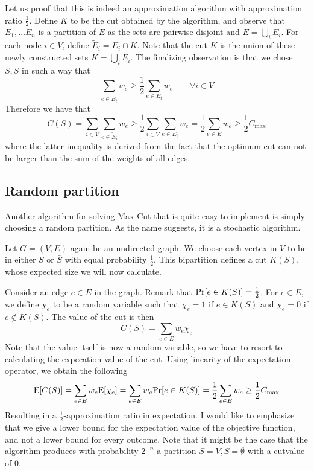 Let us proof that this is indeed an approximation algorithm with approximation ratio $\frac{1}{2}$. Define $K$ to be the cut obtained by the algorithm, and observe that $E_1, \dots E_n$ is a partition of $E$ as the sets are pairwise disjoint and $E = \bigcup_i E_i$. For each node $i \in V$, define $\tilde{E}_i = E_i \cap K$. Note that the cut $K$ is the union of these newly constructed sets $K = \bigcup_i \tilde{E}_i$. The finalizing observation is that we chose $S,\bar{S}$ in such a way that 
\begin{equation}
\sum_{e\in \tilde{E}_i}w_e \geq \frac{1}{2}\sum_{e \in E_i}w_e \qquad \forall i \in V
\end{equation}
Therefore we have that 
\begin{equation}
	C(S) = \sum_{i\in V} \sum_{e \in \tilde{E}_i} w_e \geq \frac{1}{2}\sum_{i\in V} \sum_{e \in E_i} w_e = \frac{1}{2}\sum_{e\in E} w_e \geq \frac{1}{2}C_{\max}
\end{equation}
where the latter inequality is derived from the fact that the optimum cut can not be larger than the sum of the weights of all edges.

\subsection{Random partition}
\label{sec:random-partition}
Another algorithm for solving Max-Cut that is quite easy to implement is simply choosing a random partition. As the name suggests, it is a stochastic algorithm. 

Let $G = (V,E)$ again be an undirected graph. We choose each vertex in $V$ to be in either $S$ or $\bar{S}$ with equal probability $\frac{1}{2}$. This bipartition defines a cut $K(S)$, whose expected size we will now calculate. 

Consider an edge $e \in E$ in the graph. Remark that $\text{Pr}[e \in K(S)] = \frac{1}{2}$. For $e \in E$, we define $\chi_e$ to be a random variable such that $\chi_e = 1$ if $e \in K(S)$ and $\chi_e = 0$ if $e \notin K(S)$. The value of the cut is then
\begin{equation}
	C(S) = \sum_{e\in E} w_e\chi_e
\end{equation}
Note that the value itself is now a random variable, so we have to resort to calculating the expecation value of the cut. Using linearity of the expectation operator, we obtain the following
\begin{equation}
	\text{E}[C(S)] = \sum_{e \in E} w_e\text{E}[\chi_e] = \sum_{e \in E}w_e \text{Pr}[e \in K(S)] = \frac{1}{2}\sum_{e \in E}w_e \geq \frac{1}{2}C_{\max}
\end{equation}
Resulting in a $\frac{1}{2}$-approximation ratio in expectation. I would like to emphasize that we give a lower bound for the expectation value of the objective function, and not a lower bound for every outcome. Note that it might be the case that the algorithm produces with probability $2^{-n}$ a partition $S = V, \bar{S} = \emptyset$ with a cutvalue of 0. 

